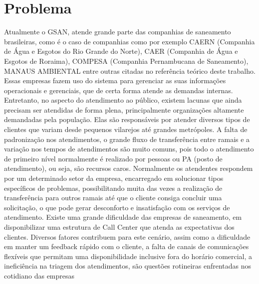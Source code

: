 \section{Problema}

Atualmente o GSAN, atende grande parte das companhias de saneamento brasileiras, como é o caso de companhias como por exemplo CAERN (Companhia de Água e Esgotos do Rio Grande do Norte), CAER (Companhia de Água e Esgotos de Roraima), COMPESA (Companhia Pernambucana de Saneamento), MANAUS AMBIENTAL entre outras citadas no referência teórico deste trabalho. Essas empresas fazem uso do sistema para gerenciar as suas informações operacionais e gerenciais, que de certa forma atende as demandas internas. Entretanto, no aspecto do atendimento ao público, existem lacunas que ainda precisam ser atendidas de forma plena, principalmente organizações altamente demandadas pela população. Elas são responsáveis por atender diversos tipos de clientes que variam desde pequenos vilarejos até grandes metrópoles.
A falta de padronização nos atendimentos, o grande fluxo de transferência entre ramais e a variação nos tempos de atendimentos são muito comuns, pois todo o atendimento de primeiro nível normalmente é realizado por pessoas ou PA (posto de atendimento), ou seja, são recursos caros. Normalmente os atendentes respondem por um determinado setor da empresa, encarregado em solucionar tipos específicos de problemas, possibilitando muita das vezes a realização de transferência para outros ramais até que o cliente consiga concluir uma solicitação, o que pode gerar desconforto e insatisfação com os serviços de atendimento.	
Existe uma grande dificuldade das empresas de saneamento, em disponibilizar uma estrutura de Call Center que atenda as expectativas dos clientes. Diversos fatores contribuem para este cenário, assim como a dificuldade em manter um feedback rápido com o cliente, a falta de canais de comunicações flexíveis que permitam uma disponibilidade inclusive fora do horário comercial, a ineficiência na triagem dos atendimentos, são questões rotineiras enfrentadas nos cotidiano das empresas
